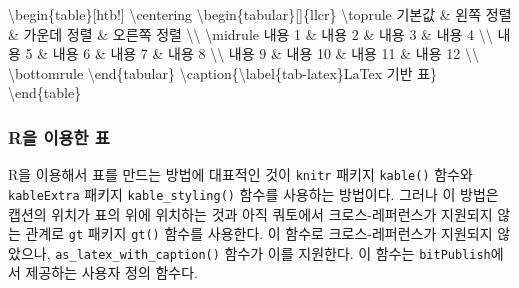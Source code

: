 \documentclass[
  letterpaper,
]{book}
\newenvironment{Shaded}{\begin{snugshade}}{\end{snugshade}}
\newcommand{\ExtensionTok}[1]{\textcolor[rgb]{0.00,0.23,0.31}{#1}}
\newcommand{\FunctionTok}[1]{\textcolor[rgb]{0.28,0.35,0.67}{#1}}
\newcommand{\KeywordTok}[1]{\textcolor[rgb]{0.00,0.23,0.31}{#1}}
\newcommand{\NormalTok}[1]{\textcolor[rgb]{0.00,0.23,0.31}{#1}}
\newcommand{\OperatorTok}[1]{\textcolor[rgb]{0.37,0.37,0.37}{#1}}
\begin{document}
\begin{Shaded}
\begin{Highlighting}[]
\KeywordTok{\textbackslash{}begin}\NormalTok{\{}\ExtensionTok{table}\NormalTok{\}[htb!]}
\FunctionTok{\textbackslash{}centering}
\KeywordTok{\textbackslash{}begin}\NormalTok{\{}\ExtensionTok{tabular}\NormalTok{\}[]\{llcr\}}
\FunctionTok{\textbackslash{}toprule}
\NormalTok{기본값  }\OperatorTok{\&}\NormalTok{ 왼쪽 정렬 }\OperatorTok{\&}\NormalTok{ 가운데 정렬 }\OperatorTok{\&}\NormalTok{ 오른쪽 정렬 }\FunctionTok{\textbackslash{}\textbackslash{}}
\FunctionTok{\textbackslash{}midrule}
\NormalTok{내용 1 }\OperatorTok{\&}\NormalTok{ 내용 2  }\OperatorTok{\&}\NormalTok{ 내용 3   }\OperatorTok{\&}\NormalTok{ 내용 4    }\FunctionTok{\textbackslash{}\textbackslash{}}
\NormalTok{내용 5 }\OperatorTok{\&}\NormalTok{ 내용 6  }\OperatorTok{\&}\NormalTok{ 내용 7   }\OperatorTok{\&}\NormalTok{ 내용 8    }\FunctionTok{\textbackslash{}\textbackslash{}}
\NormalTok{내용 9 }\OperatorTok{\&}\NormalTok{ 내용 10 }\OperatorTok{\&}\NormalTok{ 내용 11  }\OperatorTok{\&}\NormalTok{ 내용 12   }\FunctionTok{\textbackslash{}\textbackslash{}}
\FunctionTok{\textbackslash{}bottomrule}
\KeywordTok{\textbackslash{}end}\NormalTok{\{}\ExtensionTok{tabular}\NormalTok{\}}
\FunctionTok{\textbackslash{}caption}\NormalTok{\{}\KeywordTok{\textbackslash{}label}\NormalTok{\{}\ExtensionTok{tab{-}latex}\NormalTok{\}LaTex 기반 표\}}
\KeywordTok{\textbackslash{}end}\NormalTok{\{}\ExtensionTok{table}\NormalTok{\}}
\end{Highlighting}
\end{Shaded}

\hypertarget{ruxc744-uxc774uxc6a9uxd55c-uxd45c}{%
\subsubsection{R을 이용한 표}\label{ruxc744-uxc774uxc6a9uxd55c-uxd45c}}

R을 이용해서 표를 만드는 방법에 대표적인 것이
\texttt{knitr} 패키지 \texttt{kable()}
함수와 \texttt{kableExtra} 패키지
\texttt{kable\_styling()} 함수를 사용하는
방법이다. 그러나 이 방법은 캡션의 위치가 표의 위에 위치하는 것과 아직
쿼토에서 크로스-레퍼런스가 지원되지 않는 관계로 \texttt{gt}
패키지 \texttt{gt()} 함수를 사용한다. 이 함수로
크로스-레퍼런스가 지원되지 않았으나, \texttt{as\_latex\_with\_caption()}
함수가 이를 지원한다. 이 함수는 \texttt{bitPublish}에서 제공하는 사용자
정의 함수다.
\end{document}
